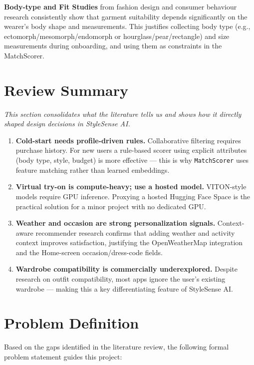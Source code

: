 \documentclass[12pt,a4paper]{report}
\newcommand{\ProjectShort}{StyleSense AI}
\begin{document}
\textbf{Body-type and Fit Studies} from fashion design and consumer behaviour research consistently show that garment suitability depends significantly on the wearer's body shape and measurements. This justifies collecting body type (e.g., ectomorph/mesomorph/endomorph or hourglass/pear/rectangle) and size measurements during onboarding, and using them as constraints in the MatchScorer.

\section{Review Summary}

\textit{This section consolidates what the literature tells us and shows how it directly shaped design decisions in \ProjectShort{}.}

\begin{enumerate}
  \item \textbf{Cold-start needs profile-driven rules.} Collaborative filtering requires purchase
        history. For new users a rule-based scorer using explicit attributes (body type, style,
        budget) is more effective --- this is why \texttt{MatchScorer} uses feature matching
        rather than learned embeddings.
  \item \textbf{Virtual try-on is compute-heavy; use a hosted model.} VITON-style models
        require GPU inference. Proxying a hosted Hugging Face Space is the practical
        solution for a minor project with no dedicated GPU.
  \item \textbf{Weather and occasion are strong personalization signals.} Context-aware
        recommender research confirms that adding weather and activity context improves
        satisfaction, justifying the OpenWeatherMap integration and the Home-screen
        occasion/dress-code fields.
  \item \textbf{Wardrobe compatibility is commercially underexplored.} Despite research on
        outfit compatibility, most apps ignore the user's existing wardrobe --- making
        this a key differentiating feature of \ProjectShort{}.
\end{enumerate}

\section{Problem Definition}

Based on the gaps identified in the literature review, the following formal problem statement guides this project:
\end{document}
